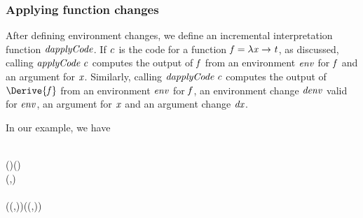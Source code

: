 \subsubsection{Applying function changes}
After defining environment changes, we define an incremental interpretation
function \ensuremath{\Varid{dapplyCode}}. If \ensuremath{\Varid{c}} is the code for a function \ensuremath{\Varid{f}\mathrel{=}\lambda \Varid{x}\to \Varid{t}}, as
discussed, calling \ensuremath{\Varid{applyCode}\;\Varid{c}} computes the output of \ensuremath{\Varid{f}} from an environment
\ensuremath{\Varid{env}} for \ensuremath{\Varid{f}} and an argument for \ensuremath{\Varid{x}}. Similarly, calling \ensuremath{\Varid{dapplyCode}\;\Varid{c}}
computes the output of \ensuremath{\Derive{\Varid{f}}} from an environment \ensuremath{\Varid{env}} for \ensuremath{\Varid{f}}, an
environment change \ensuremath{\Varid{denv}} valid for \ensuremath{\Varid{env}}, an argument for \ensuremath{\Varid{x}} and an argument
change \ensuremath{\Varid{dx}}.


In our example, we have
\begin{hscode}\SaveRestoreHook
{}%
%
%
%
%
%
%
%
%
%
%
\>[B]{}\mathrel{:\mkern-1mu:}{}\<[17]%
\>[17]{}\;\;\sigma\;\tau\to {}\<[41]%
\>[41]{}\to {}\<[49]%
\>[49]{}\Delta {}\to {}\<[60]%
\>[60]{}\sigma\to {}\<[70]%
\>[70]{}\Delta \sigma\to {}\<[86]%
\>[86]{}\Delta \tau{}\<[E]%
\\
\>[B]{}\;{}\<[17]%
\>[17]{}\;{}\<[41]%
\>[41]{}()\;{}\<[49]%
\>[49]{}()\;{}\<[60]%
\>[60]{}\;{}\<[70]%
\>[70]{}\<[83]%
\>[83]{}\mathrel{=}{}\<[83E]%
\>[86]{}\<[E]%
\\
\>[B]{}\;{}\<[17]%
\>[17]{}\;{}\<[41]%
\>[41]{}\;{}\<[49]%
\>[49]{}\;{}\<[60]%
\>[60]{}\;{}\<[70]%
\>[70]{}\<[83]%
\>[83]{}\mathrel{=}{}\<[83E]%
\>[86]{}(,){}\<[E]%
\\
\>[B]{}\;{}\<[17]%
\>[17]{}\;{}\<[41]%
\>[41]{}\;{}\<[49]%
\>[49]{}\;{}\<[60]%
\>[60]{}\;{}\<[70]%
\>[70]{}\<[83]%
\>[83]{}\mathrel{=}{}\<[83E]%
\\
\>[B]{}\<[3]%
\>[3]{}\;(\;(,))\;(\;(,))\;\;\<[E]%
\ColumnHook
\end{hscode}\resethooks

